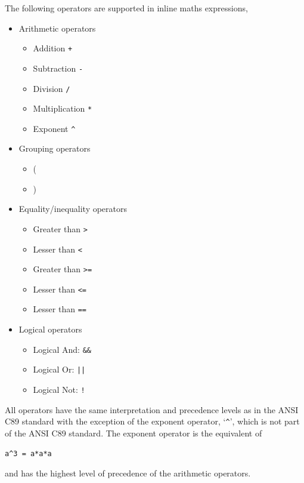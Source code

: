 \documentclass[draftspec]{ninemlspec}
\begin{document}
The following operators are supported in inline maths expressions,
\begin{itemize}
\item Arithmetic operators
\begin{itemize}
\item Addition \verb|+|
\item Subtraction \verb|-|
\item Division \verb|/|
\item Multiplication \verb|*|
\item Exponent \verb|^|
\end{itemize}

\item Grouping operators
\begin{itemize}
\item (
\item )
\end{itemize}

\item Equality/inequality operators
\begin{itemize}
\item Greater than \verb|>|
\item Lesser than \verb|<|
\item Greater than \verb|>=|
\item Lesser than \verb|<=|
\item Lesser than \verb|==|
\end{itemize}

\item Logical operators
\begin{itemize}
\item Logical And: \verb|&&|
\item Logical Or:  \verb+||+
\item Logical Not: \verb|!|
\end{itemize}

\end{itemize}
All operators have the same interpretation and precedence levels as in the ANSI C89 standard with the exception of the exponent operator, `\verb|^|', which is not part of the ANSI C89 standard. The exponent operator is the equivalent of
 \begin{lstlisting}
a^3 = a*a*a
\end{lstlisting}
and has the highest level of precedence of the arithmetic operators.
\end{document}

